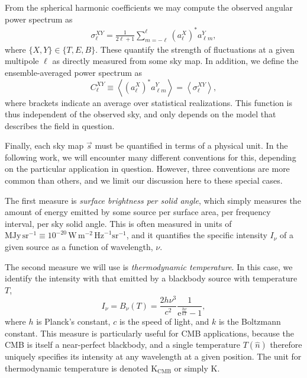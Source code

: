 \documentclass[twocolumn]{aa}
\newcommand{\s}[0]{\vec{s}}
\newcommand{\e}{\mathrm e}
\begin{document}
From the spherical harmonic coefficients we may compute the observed
angular power spectrum as
\begin{align}
\sigma_{\ell}^{XY} = \frac{1}{2\ell+1} \sum_{m=-\ell}^{\ell} \left(a_{\ell}^X\right)^*
a_{\ell m}^Y,
\label{eq:sigmal}
\end{align}
where $\{X,Y\} \in \{T,E,B\}$. These quantify the strength of
fluctuations at a given multipole $\ell$ as directly measured from
some sky map. In addition, we define the ensemble-averaged power
spectrum as
\begin{equation}
C_{\ell}^{XY} \equiv \left<\left(a_{\ell}^X\right)^* a_{\ell m}^Y \right> = \left<
\sigma_{\ell}^{XY} \right>,
\end{equation}
where brackets indicate an average over statistical realizations. This
function is thus independent of the observed sky, and only depends on
the model that describes the field in question. 

Finally, each sky map $\s$ must be quantified in terms of a physical
unit. In the following work, we will encounter many different
conventions for this, depending on the particular application in
question. However, three conventions are more common than others, and
we limit our discussion here to these special cases.

The first measure is \emph{surface brightness per solid angle}, which
simply measures the amount of energy emitted by some source per
surface area, per frequency interval,  per sky solid angle. This is often
measured in units of ${\textrm{MJy}\,\textrm{sr}^{-1} \equiv
10^{-20}\,\textrm{W}\,\textrm{m}^{-2}\,\textrm{Hz}^{-1}\textrm{sr}^{-1}}$,
and it quantifies the specific intensity $I_{\nu}$ of a given source as a
function of wavelength, $\nu$.

The second measure we will use is \emph{thermodynamic temperature}. In
this case, we identify the intensity with that emitted by a blackbody
source with temperature $T$,
\begin{equation}
  I_{\nu} = B_{\nu}(T) =
  \frac{2h\nu^3}{c^2}\frac{1}{\e^{\frac{h\nu}{kT}}-1},
  \label{eq:T_thermo}
\end{equation}
where $h$ is Planck's constant, $c$ is the speed of light, and $k$ is
the Boltzmann constant. This measure is particularly useful for CMB
applications, because the CMB is itself a near-perfect blackbody, and
a single temperature $T(\hat{n})$ therefore uniquely specifies its
intensity at any wavelength at a given position. The unit for
thermodynamic temperature is denoted $\textrm{K}_{\mathrm{CMB}}$ or
simply $\mathrm{K}$. 
\end{document}
